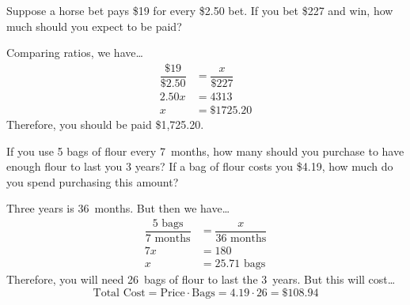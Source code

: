 \documentclass[11pt,letterpaper]{article}
\begin{document}
\newpage



 Suppose a horse bet pays \$19 for every \$2.50 bet. If you bet \$227 and win, how much should you expect to be paid? \pspace

\sol Comparing ratios, we have\dots
	\[
	\begin{aligned}
	\dfrac{\$19}{\$2.50}&= \dfrac{x}{\$227} \\[0.3cm]
	2.50x&= 4313 \\[0.3cm]
	x&= \$1725.20
	\end{aligned}
	\]
Therefore, you should be paid \$1,725.20.



\newpage



 If you use 5 bags of flour every 7~months, how many should you purchase to have enough flour to last you 3 years? If a bag of flour costs you \$4.19, how much do you spend purchasing this amount? \pspace

\sol Three years is 36~months. But then we have\dots \pspace
	\[
	\begin{aligned}
	\dfrac{5 \text{ bags}}{7 \text{ months}}&= \dfrac{x}{36 \text{ months}} \\[0.3cm]
	7x&= 180 \\[0.3cm]
	x&= 25.71 \text{ bags}
	\end{aligned}
	\] \pspace
Therefore, you will need 26~bags of flour to last the 3~years. But this will cost\dots \pspace
	\[
	\text{Total Cost}= \text{Price} \cdot \text{Bags}=  4.19 \cdot 26= \$108.94
	\]
\end{document}
